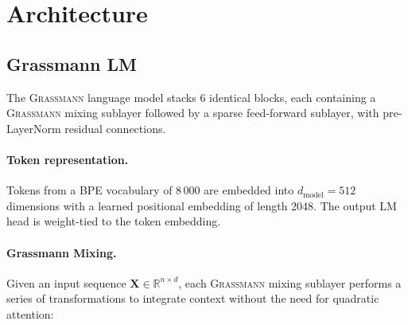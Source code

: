 \documentclass[conference]{IEEEtran}
\newcommand{\grassmann}{\textsc{Grassmann}}
\begin{document}
\section{Architecture}
\label{sec:arch}

\subsection{Grassmann LM}

The \grassmann{} language model stacks 6 identical blocks, each
containing a \grassmann{} mixing sublayer followed by a sparse
feed-forward sublayer, with pre-LayerNorm residual connections.

\paragraph{Token representation.}
Tokens from a BPE vocabulary of 8\,000 are embedded into
$d_{\text{model}} = 512$ dimensions with a learned positional embedding
of length 2048. The output LM head is weight-tied to the token
embedding.

\paragraph{Grassmann Mixing.}
Given an input sequence $\mathbf{X} \in \mathbb{R}^{n \times d}$, each \grassmann{} mixing sublayer performs a series of transformations to integrate context without the need for quadratic attention:
\end{document}
